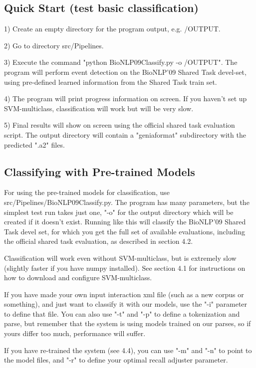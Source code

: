 \documentclass[a4paper,12pt]{article}
\begin{document}
\subsection{Quick Start (test basic classification)}

1) Create an empty directory for the program output, e.g. /OUTPUT.

2) Go to directory src/Pipelines.

3) Execute the command "python BioNLP09Classify.py -o /OUTPUT". The program will perform event detection on the BioNLP'09 Shared Task devel-set, using pre-defined learned information from the Shared Task train set.

4) The program will print progress information on screen. If you haven't set up SVM-multiclass, classification will work but will be very slow.

5) Final results will show on screen using the official shared task evaluation script. The output directory will contain a "geniaformat" subdirectory with the predicted ".a2" files.

\subsection{Classifying with Pre-trained Models}

For using the pre-trained models for classification, use src/Pipelines/BioNLP09Classify.py. The program has many parameters, but the simplest test run takes just one, "-o" for the output directory which will be created if it doesn't exist. Running like this will classify the BioNLP'09 Shared Task devel set, for which you get the full set of available evaluations, including the official shared task evaluation, as described in section 4.2.

Classification will work even without SVM-multiclass, but is extremely slow (slightly faster if you have numpy installed). See section 4.1 for instructions on how to download and configure SVM-multiclass.

If you have made your own input interaction xml file (such as a new corpus or something), and just want to classify it with our models, use the "-i" parameter to define that file. You can also use "-t" and "-p" to define a tokenization and parse, but remember that the system is using models trained on our parses, so if yours differ too much, performance will suffer.

If you have re-trained the system (see 4.4), you can use "-m" and "-n" to point to the model files, and "-r" to define your optimal recall adjuster parameter.
\end{document}
